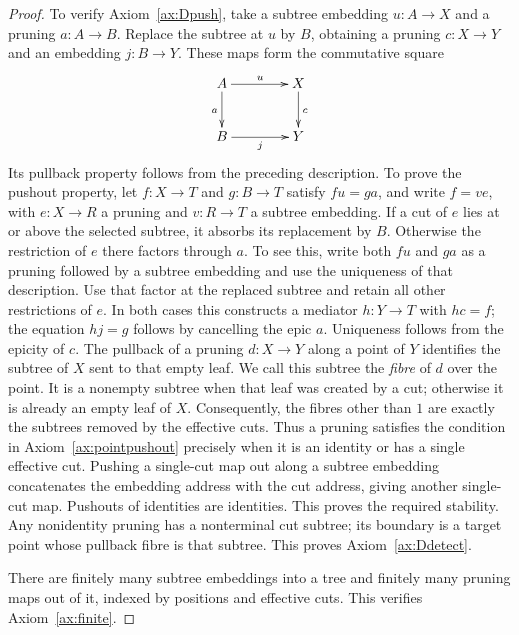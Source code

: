 \documentclass[11pt,a4paper]{article}
\theoremstyle{plain}
\theoremstyle{definition}
\theoremstyle{remark}
\newcommand{\one}{1}
\begin{document}
\begin{proof}
To verify Axiom~\ref{ax:Dpush}, take a subtree embedding $u:A\to X$
and a pruning $a:A\to B$. Replace the subtree at $u$ by $B$,
obtaining a pruning $c:X\to Y$ and an embedding $j:B\to Y$.
These maps form the commutative square
\[
 \xymatrix@C=4em@R=2.5em{
A\ar[r]^u\ar[d]_a&X\ar[d]^c\\
B\ar[r]_j&Y
 }
\]
Its pullback property follows from the preceding description. To prove the pushout property, let $f:X\to T$ and $g:B\to T$
satisfy $fu=ga$, and write $f=ve$, with $e:X\to R$ a pruning
and $v:R\to T$ a subtree embedding. If a cut of $e$ lies at or above the selected
subtree, it absorbs its replacement by $B$. Otherwise the restriction
of $e$ there factors through $a$. To see this, write both $fu$ and
$ga$ as a pruning followed by a subtree embedding and use the
uniqueness of that description. Use that factor at the replaced subtree and
retain all other restrictions of $e$. In both cases this constructs
a mediator $h:Y\to T$ with $hc=f$; the equation $hj=g$ follows by
cancelling the epic $a$. Uniqueness follows from the epicity of $c$.
The pullback of a pruning $d:X\to Y$ along a point of $Y$
identifies the subtree of $X$ sent to that empty leaf. We call this
subtree the \emph{fibre} of $d$ over the point. It is a nonempty
subtree when that leaf was created by a cut; otherwise it is already
an empty leaf of $X$. Consequently, the fibres other than $\one$
are exactly the subtrees removed by the effective cuts. Thus a
pruning satisfies the condition in Axiom~\ref{ax:pointpushout}
precisely when it is an identity or has a single effective cut. Pushing a single-cut map out along a
subtree embedding concatenates the embedding address with the cut
address, giving another single-cut map. Pushouts of identities are
identities. This proves the required stability.
Any nonidentity pruning has a
nonterminal cut subtree; its boundary is a target point whose pullback
fibre is that subtree. This proves Axiom~\ref{ax:Ddetect}.

There are finitely many subtree embeddings into a tree and finitely
many pruning maps out of it, indexed by positions and effective cuts.
This verifies Axiom~\ref{ax:finite}.


\end{proof}
\end{document}
